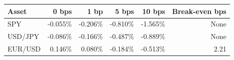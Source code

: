 \begin{tabular}{lrrrrr}
\toprule
Asset & 0 bps & 1 bp & 5 bps & 10 bps & Break-even bps \\
\midrule
SPY & -0.055\% & -0.206\% & -0.810\% & -1.565\% & None \\
USD/JPY & -0.086\% & -0.166\% & -0.487\% & -0.889\% & None \\
EUR/USD & 0.146\% & 0.080\% & -0.184\% & -0.513\% & 2.21 \\
\bottomrule
\end{tabular}
